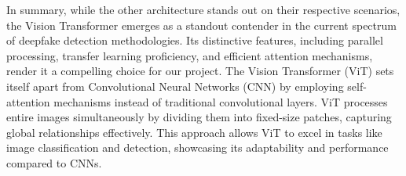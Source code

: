 In summary, while the other architecture stands out on their respective scenarios, the Vision Transformer emerges as a standout contender in the current spectrum of deepfake detection methodologies. Its distinctive features, including parallel processing, transfer learning proficiency, and efficient attention mechanisms, render it a compelling choice for our project. The Vision Transformer (ViT) sets itself apart from Convolutional Neural Networks (CNN) by employing self-attention mechanisms instead of traditional convolutional layers. ViT processes entire images simultaneously by dividing them into fixed-size patches, capturing global relationships effectively. This approach allows ViT to excel in tasks like image classification and detection, showcasing its adaptability and performance compared to CNNs.
